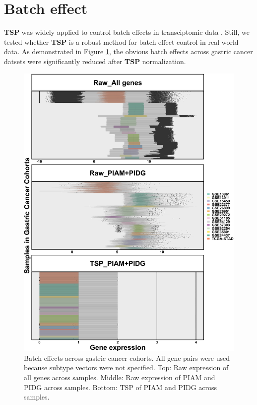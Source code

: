 \documentclass[
  12pt,
]{book}
\begin{document}
\hypertarget{batch-effect}{%
\section{Batch effect}\label{batch-effect}}

\textbf{TSP} was widely applied to control batch effects in transciptomic data \citep{RN369, RN367, RN368, RN364, RN363, RN362, RN366, RN365}. Still, we tested whether \textbf{TSP} is a robust method for batch effect control in real-world data. As demonstrated in Figure \ref{fig:be01}, the obvious batch effects across gastric cancer datsets were significantly reduced after \textbf{TSP} normalization.

\begin{figure}

{\centering \includegraphics[width=0.9\linewidth]{./fig/bactch-effect-01} 

}

\caption{Batch effects across gastric cancer cohorts. All gene pairs were used because subtype vectors were not specified. Top: Raw expression of all genes across samples. Middle: Raw expression of PIAM and PIDG across samples. Bottom: TSP of PIAM and PIDG across samples.}\label{fig:be01}
\end{figure}
\end{document}

